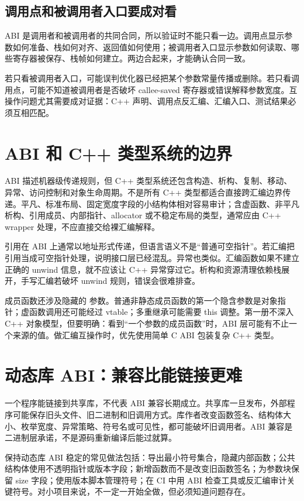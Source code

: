 \subsection{调用点和被调用者入口要成对看}

ABI 是调用者和被调用者的共同合同，所以验证时不能只看一边。调用点显示参数如何准备、栈如何对齐、返回值如何使用；被调用者入口显示参数如何读取、哪些寄存器被保存、栈帧如何建立。两边合起来，才能确认合同一致。

若只看被调用者入口，可能误判优化器已经把某个参数常量传播或删除。若只看调用点，可能不知道被调用者是否破坏 callee-saved 寄存器或错误解释参数宽度。互操作问题尤其需要成对证据：C++ 声明、调用点反汇编、汇编入口、测试结果必须互相匹配。

\section{ABI 和 C++ 类型系统的边界}

ABI 描述机器级传递规则，但 C++ 类型系统还包含构造、析构、复制、移动、异常、访问控制和对象生命周期。不是所有 C++ 类型都适合直接跨汇编边界传递。平凡、标准布局、固定宽度字段的小结构体相对容易审计；含虚函数、非平凡析构、引用成员、内部指针、allocator 或不稳定布局的类型，通常应由 C++ wrapper 处理，不应直接交给裸汇编解释。

引用在 ABI 上通常以地址形式传递，但语言语义不是“普通可空指针”。若汇编把引用当成可空指针处理，说明接口层已经混乱。异常也类似。汇编函数如果不建立正确的 unwind 信息，就不应该让 C++ 异常穿过它。析构和资源清理依赖栈展开，手写汇编若破坏 unwind 规则，错误会很难排查。

成员函数还涉及隐藏的  参数。普通非静态成员函数的第一个隐含参数是对象指针；虚函数调用还可能经过 vtable；多重继承可能需要 this 调整。第一册不深入 C++ 对象模型，但要明确：看到“一个参数的成员函数”时，ABI 层可能有不止一个来源的值。做汇编互操作时，优先使用简单 C ABI 包装复杂 C++ 类型。

\section{动态库 ABI：兼容比能链接更难}

一个程序能链接到共享库，不代表 ABI 兼容长期成立。共享库一旦发布，外部程序可能保存旧头文件、旧二进制和旧调用方式。库作者改变函数签名、结构体大小、枚举宽度、异常策略、符号名或可见性，都可能破坏旧调用者。ABI 兼容是二进制层承诺，不是源码重新编译后能过就算。

保持动态库 ABI 稳定的常见做法包括：导出最小符号集合，隐藏内部函数；公共结构体使用不透明指针或版本字段；新增函数而不是改变旧函数签名；为参数块保留 size 字段；使用版本脚本管理符号；在 CI 中用 ABI 检查工具或反汇编审计关键符号。对小项目来说，不一定一开始全做，但必须知道问题存在。

